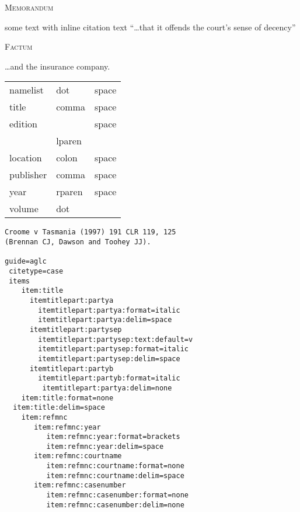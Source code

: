 \textsc{Memorandum} 

\medskip
some text with inline citation  text ``\ldots that it offends the court's sense of decency'' 

\bigskip
\textsc{Factum} 

\medskip
\ldots and the insurance company.

\medskip
{}



\bigskip
\begin{tabular}{lll}
namelist & dot & space \\
title & comma & space \\
edition & & space \\
 & lparen &  \\
location & colon & space \\
publisher & comma & space \\
year & rparen & space \\
volume & dot &  \\
\end{tabular}




\begin{verbatim}
Croome v Tasmania (1997) 191 CLR 119, 125 
(Brennan CJ, Dawson and Toohey JJ). 

guide=aglc
 citetype=case
 items
 	item:title
 	  itemtitlepart:partya
 	    itemtitlepart:partya:format=italic
 	    itemtitlepart:partya:delim=space
 	  itemtitlepart:partysep
 	    itemtitlepart:partysep:text:default=v
 	    itemtitlepart:partysep:format=italic
 	    itemtitlepart:partysep:delim=space
 	  itemtitlepart:partyb
  	    itemtitlepart:partyb:format=italic
 	     itemtitlepart:partya:delim=none
 	item:title:format=none
  item:title:delim=space
   	item:refmnc
   	   item:refmnc:year
   	      item:refmnc:year:format=brackets
   	      item:refmnc:year:delim=space   	      
   	   item:refmnc:courtname
   	      item:refmnc:courtname:format=none
   	      item:refmnc:courtname:delim=space 
   	   item:refmnc:casenumber
   	      item:refmnc:casenumber:format=none
   	      item:refmnc:casenumber:delim=none

\end{verbatim}



